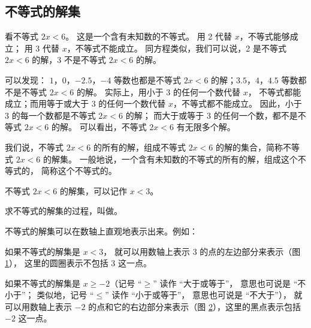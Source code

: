 \subsection{不等式的解集}\label{subsec:4-2}

看不等式 $2x < 6$。 这是一个含有未知数的不等式。
用 2 代替 $x$，不等式能够成立； 用 3 代替 $x$，不等式不能成立。
同方程类似，我们可以说，2 是不等式 $2x < 6$ 的解，3 不是不等式 $2x < 6$ 的解。

可以发现： $1$，$0$，$-2.5$，$-4$ 等数也都是不等式 $2x < 6$ 的解；$3.5$，$4$，$4.5$ 等数都不是不等式 $2x < 6$ 的解。
实际上，用小于 3 的任何一个数代替 $x$， 不等式都能成立；而用等于或大于 3 的任何一个数代替 $x$，不等式都不能成立。
因此，小于 3 的每一个数都是不等式 $2x < 6$ 的解； 而大于或等于 3 的任何一个数，都不是不等式 $2x < 6$ 的解。
可以看出，不等式 $2x < 6$ 有无限多个解。

我们说，不等式 $2x < 6$ 的所有的解，组成不等式 $2x < 6$ 的解的集合，简称不等式 $2x < 6$ 的解集。
一般地说，一个含有未知数的不等式的所有的解，组成这个不等式的， 简称这个不等式的。

不等式 $2x < 6$ 的解集，可以记作 $x < 3$。

求不等式的解集的过程，叫做。

不等式的解集可以在数轴上直观地表示出来。例如：

如果不等式的解集是 $x < 3$， 就可以用数轴上表示 3 的点的左边部分来表示（图 \ref{fig:4-1}）， 这里的圆圈表示不包括 3 这一点。

\begin{figure}[htbp]
    \centering
    
    \caption{}\label{fig:4-1}
\end{figure}

如果不等式的解集是 $x \geqslant -2$（记号 “$\geqslant$” 读作 “大于或等于”， 意思也可说是 “不小于”；
类似地，记号 “$\leqslant$” 读作 “小于或等于”， 意思也可说是 “不大于”），
就可以用数轴上表示 $-2$ 的点和它的右边部分来表示（图 \ref{fig:4-2}），这里的黑点表示包括 $-2$ 这一点。

\begin{figure}[htbp]
    \centering
    
    \caption{}\label{fig:4-2}
\end{figure}

